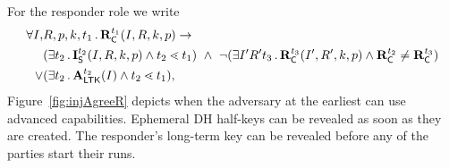 %
For the responder role we write
\begin{align*}
    \forall I,& R, p, k, t_1\mLogicDot \mRComplete^{t_1}(I, R, k, p)
    \rightarrow\\
    &(\exists t_2\mLogicDot \mIStart^{t_2}(I, R, k, p) \land t_2 \lessdot t_1)\ 
    \land\ \neg(\exists I' R' t_3 \mLogicDot \mRComplete^{t_3}(I' , R', k, p)
        \land \mRComplete^{t_2} \not = \mRComplete^{t_3}) \\
    \lor&(\exists t_2\mLogicDot \mRevLTK^{t_2}(I) \land t_2 \lessdot t_1),
\end{align*}
%
Figure~\ref{fig:injAgreeR} depicts when the adversary at the earliest can use
advanced capabilities.
%
Ephemeral DH half-keys can be revealed as soon as they are created.
%
The responder's long-term key can be revealed before any of the parties start
their runs.
%
